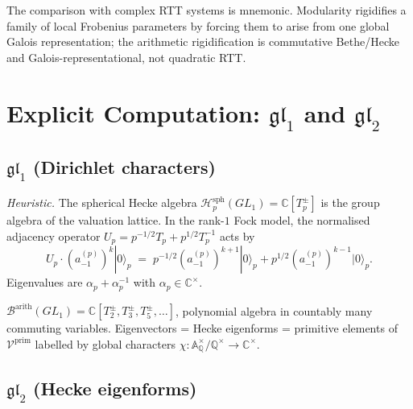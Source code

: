 \begin{remark}
The comparison with complex RTT systems is mnemonic.
Modularity rigidifies a family of local Frobenius parameters by
forcing them to arise from one global Galois representation;
the arithmetic rigidification is commutative Bethe/Hecke and
Galois-representational, not quadratic RTT.
\end{remark}

\section{Explicit Computation: \(\mathfrak{gl}_{1}\) and \(\mathfrak{gl}_{2}\)}
\label{v4-arith:dr:explicit-gl1-gl2}

\subsection{\(\mathfrak{gl}_{1}\) (Dirichlet characters)}

\begin{proposition}
\label{v4-arith:prop:gl1-hecke-on-fock}
\emph{Heuristic.} The spherical Hecke algebra
\(\mathcal{H}_{p}^{\mathrm{sph}}(GL_{1})=\mathbb{C}[T_{p}^{\pm}]\)
is the group algebra of the valuation lattice. In the rank-\(1\)
Fock model, the normalised adjacency operator
\(U_{p}=p^{-1/2}T_{p}+p^{1/2}T_{p}^{-1}\) acts by
\begin{equation*}
U_{p}\cdot(a^{(p)}_{-1})^{k}|0\rangle_{p}\;=\;p^{-1/2}(a^{(p)}_{-1})^{k+1}|0\rangle_{p}+p^{1/2}(a^{(p)}_{-1})^{k-1}|0\rangle_{p}.
\end{equation*}
Eigenvalues are \(\alpha_{p}+\alpha_{p}^{-1}\) with \(\alpha_{p}\in\mathbb{C}^{\times}\).
\end{proposition}

\begin{corollary}
\label{v4-arith:cor:gl1-hecke-is-polynomial}
\(\mathcal{B}^{\mathrm{arith}}(GL_{1})=\mathbb{C}[T_{2}^{\pm},T_{3}^{\pm},T_{5}^{\pm},\ldots]\),
polynomial algebra in countably many commuting variables.
Eigenvectors = Hecke eigenforms = primitive elements of
\(\mathcal{V}^{\mathrm{prim}}\) labelled by global characters
\(\chi\colon\mathbb{A}_{\mathbb{Q}}^{\times}/\mathbb{Q}^{\times}\to\mathbb{C}^{\times}\).
\end{corollary}

\subsection{\(\mathfrak{gl}_{2}\) (Hecke eigenforms)}

